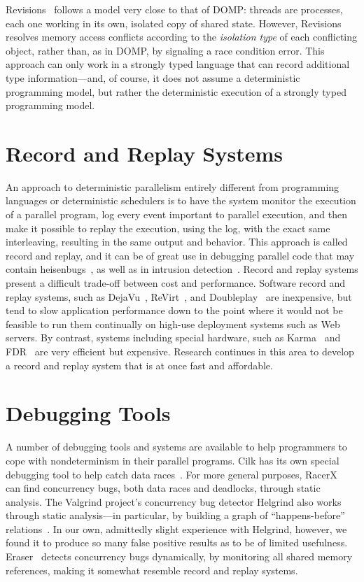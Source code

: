 Revisions~\cite{burckhardt10revisions} follows a model very close to that of DOMP:  threads are processes, each one working in its own, isolated copy of shared state.  However, Revisions resolves memory access conflicts according to the \textit{isolation type} of each conflicting object, rather than, as in DOMP, by signaling a race condition error.  This approach can only work in a strongly typed language that can record additional type information---and, of course, it does not assume a deterministic programming model, but rather the deterministic execution of a strongly typed programming model.

\section{Record and Replay Systems}
An approach to deterministic parallelism entirely different from programming languages or deterministic schedulers is to have the system monitor the execution of a parallel program, log every event important to parallel execution, and then make it possible to replay the execution, using the log, with the exact same interleaving, resulting in the same output and behavior.  This approach is called 
record 
and replay, and it can be of great use in debugging parallel code that may 
contain heisenbugs~\cite{agrawal91backtracking, king05debugging, srinavasan04flashback}, as well as in intrusion detection~\cite{dunlap02revirt}.  Record and replay systems present a difficult trade-off between cost and performance.  Software record and replay systems, such as DejaVu~\cite{choi98deterministic}, ReVirt~\cite{dunlap02revirt}, and Doubleplay~\cite{veeraraghavan11doubleplay} are inexpensive, but tend to slow application performance down to the point where it would not be feasible to run them continually on high-use deployment systems such as Web servers.  By contrast, systems including special hardware, such as Karma~\cite{basu11karma} and FDR~\cite{xu03replay} 
are very efficient but expensive.  Research continues in this area to develop a record and replay system that is at once fast and affordable.

\section{Debugging Tools}
A number of debugging tools and systems are available to help programmers to cope with nondeterminism in their parallel programs.  Cilk has its own special debugging tool to help catch data races~\cite{leiserson97cilk}.  For more general purposes, RacerX~\cite{engler03racerx} can find concurrency bugs, both data races and deadlocks, through static analysis.  The Valgrind project's concurrency bug detector Helgrind also works through static analysis---in particular, by building a graph of ``happens-before'' relations~\cite{nethercote07valgrind}.  In our own, admittedly slight experience with Helgrind, however, we found it to produce so many false positive results as to be of limited usefulness.  Eraser~\cite{savage97eraser} detects concurrency bugs dynamically, by monitoring all shared memory references, making it somewhat resemble record and replay systems.

